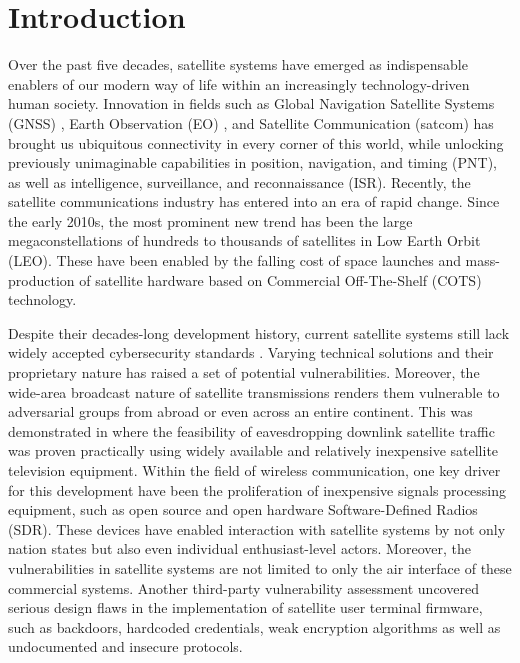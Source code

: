 \documentclass[english, 12pt, a4paper, elec, utf8, a-1b, online]{aaltothesis}
\begin{document}
\cleardoublepage

\section{Introduction}

Over the past five decades, satellite systems have emerged as indispensable enablers of our modern way of life within an increasingly technology-driven human society.
Innovation in fields such as Global Navigation Satellite Systems (GNSS) \cite{oconnor2019economic}, Earth Observation (EO) \cite{lupi2022socioeconomic, tassa2020socioeconomic}, and Satellite Communication (satcom) \cite{x} has brought us ubiquitous connectivity in every corner of this world, while unlocking previously unimaginable capabilities in position, navigation, and timing (PNT), as well as intelligence, surveillance, and reconnaissance (ISR).
Recently, the satellite communications industry has entered into an era of rapid change.
Since the early 2010s, the most prominent new trend has been the large megaconstellations of hundreds to thousands of satellites in Low Earth Orbit (LEO).
These have been enabled by the falling cost of space launches and mass-production of satellite hardware based on Commercial Off-The-Shelf (COTS) technology.

Despite their decades-long development history,  current satellite systems still lack widely accepted cybersecurity standards \cite{lin2022defending}.
Varying technical solutions and their proprietary nature has raised a set of potential vulnerabilities.
Moreover, the wide-area broadcast nature of satellite transmissions renders them vulnerable to adversarial groups from abroad or even across an entire continent.
This was demonstrated in \cite{pavur2020tale} where the feasibility of eavesdropping downlink satellite traffic was proven practically using widely available and relatively inexpensive satellite television equipment.
Within the field of wireless communication, one key driver for this development have been the proliferation of inexpensive signals processing equipment, such as open source and open hardware Software-Defined Radios (SDR).
These devices have enabled interaction with satellite systems by not only nation states but also even individual enthusiast-level actors.
Moreover, the vulnerabilities in satellite systems are not limited to only the air interface of these commercial systems.
Another third-party vulnerability assessment \cite{santamarta2014wake} uncovered serious design flaws in the implementation of satellite user terminal firmware, such as backdoors, hardcoded credentials, weak encryption algorithms as well as undocumented and insecure protocols.
\end{document}
